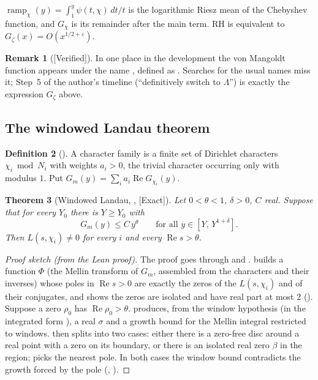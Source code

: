 \documentclass[11pt]{article}
\newcommand{\Exact}{\textcolor{exactc}{\textsf{\small[Exact]}}}
\newcommand{\Verified}{\textcolor{verc}{\textsf{\small[Verified]}}}
\newcommand{\eps}{\varepsilon}
\newcommand{\re}{\operatorname{Re}}
\newcommand{\Gz}{G_\zeta}
\theoremstyle{plain}
\newtheorem{theorem}{Theorem}[section]
\theoremstyle{definition}
\newtheorem{definition}[theorem]{Definition}
\newtheorem{remark}[theorem]{Remark}
\newenvironment{sketch}{\begin{proof}[Proof sketch (from the Lean proof)]}{\end{proof}}
\begin{document}
$\operatorname{ramp}_\chi(y) = \int_1^y \psi(t,\chi)\,dt/t$ is the logarithmic Riesz mean of the
Chebyshev function, and $G_\chi$ is its remainder after the main term. RH is equivalent to
$\Gz(x) = O(x^{1/2+\eps})$.

\begin{remark}[\Verified]
In one place in the development the von Mangoldt function appears under the name
, defined as . Searches for the usual names
miss it; Step~5 of the author's timeline (``definitively switch to $\Lambda$'') is exactly the
expression $\Gz$ above.
\end{remark}

\subsection{The windowed Landau theorem}

\begin{definition}[]
A character family is a finite set of Dirichlet characters $\chi_i \bmod N_i$ with weights
$a_i>0$, the trivial character occurring only with modulus $1$. Put
$G_m(y) = \sum_i a_i \re G_{\chi_i}(y)$.
\end{definition}

\begin{theorem}[Windowed Landau, , \Exact]\label{thm:landau}
Let $0<\theta<1$, $\delta>0$, $C$ real. Suppose that for every $Y_0$ there is $Y\ge Y_0$ with
\[
G_m(y)\le C\,y^{\theta}\qquad\text{for all } y\in[Y,\,Y^{1+\delta}].
\]
Then $L(s,\chi_i)\neq 0$ for every $i$ and every $\re s>\theta$.
\end{theorem}

\begin{sketch}
The proof goes through  and .  builds a function
$\Phi$ (the Mellin transform of $G_m$, assembled from the characters and their inverses) whose poles
in $\re s>0$ are exactly the zeros of the $L(s,\chi_i)$ and of their conjugates, and shows the
zeros are isolated and have real part at most $2$ (). Suppose a zero
$\rho_0$ has $\re\rho_0>\theta$.  produces, from the window hypothesis
(in the integrated form ), a real $\sigma$ and a growth bound for the Mellin
integral restricted to windows.  then splits into two cases: either there is
a zero-free disc around a real point with a zero on its boundary, or there is an isolated real zero
$\beta$ in the region;  picks the nearest pole. In both cases the window bound
contradicts the growth forced by the pole (,
).
\end{sketch}
\end{document}
